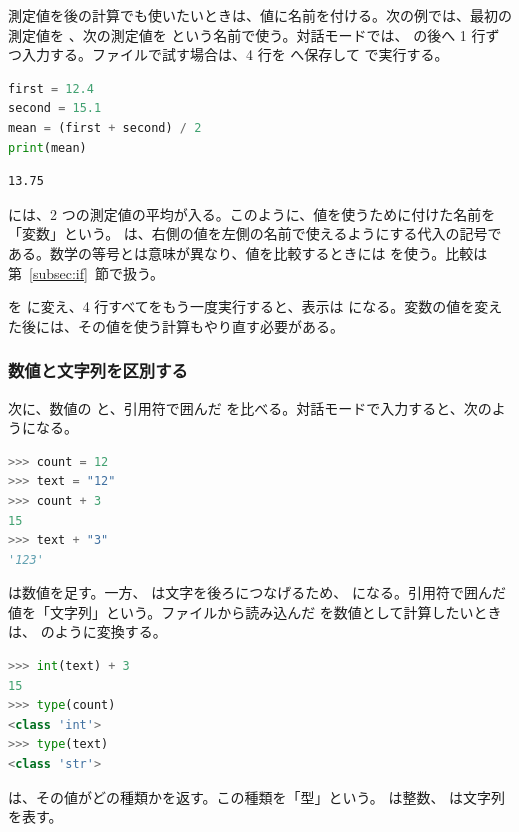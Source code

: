 測定値を後の計算でも使いたいときは、値に名前を付ける。次の例では、最初の測定値を 、次の測定値を  という名前で使う。対話モードでは、\code{>>>} の後へ 1 行ずつ入力する。ファイルで試す場合は、4 行を  へ保存して  で実行する。

\begin{lstlisting}[language=Python, numbers=none, xleftmargin=2\zw]
first = 12.4
second = 15.1
mean = (first + second) / 2
print(mean)
\end{lstlisting}

\begin{lstlisting}[numbers=none, xleftmargin=2\zw]
13.75
\end{lstlisting}

 には、2 つの測定値の平均が入る。このように、値を使うために付けた名前を「変数」という。\code{=} は、右側の値を左側の名前で使えるようにする代入の記号である。数学の等号とは意味が異なり、値を比較するときには \code{==} を使う。比較は第~\ref{subsec:if}~節で扱う。

 を  に変え、4 行すべてをもう一度実行すると、表示は  になる。変数の値を変えた後には、その値を使う計算もやり直す必要がある。

\subsubsection{数値と文字列を区別する}

次に、数値の  と、引用符で囲んだ  を比べる。対話モードで入力すると、次のようになる。

\begin{lstlisting}[language=Python, numbers=none, xleftmargin=2\zw]
>>> count = 12
>>> text = "12"
>>> count + 3
15
>>> text + "3"
'123'
\end{lstlisting}

 は数値を足す。一方、 は文字を後ろにつなげるため、 になる。引用符で囲んだ値を「文字列」という。ファイルから読み込んだ  を数値として計算したいときは、 のように変換する。

\begin{lstlisting}[language=Python, numbers=none, xleftmargin=2\zw]
>>> int(text) + 3
15
>>> type(count)
<class 'int'>
>>> type(text)
<class 'str'>
\end{lstlisting}

 は、その値がどの種類かを返す。この種類を「型」という。 は整数、 は文字列を表す。

